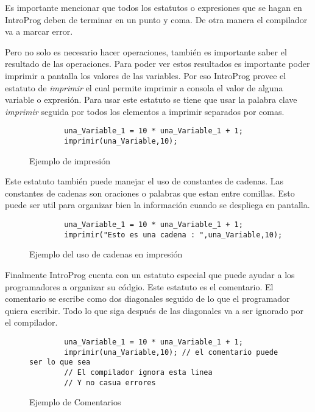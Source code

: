 Es importante mencionar que todos los estatutos o expresiones que se hagan en IntroProg deben de terminar en un punto y coma. De otra manera el compilador va a marcar error.

Pero no solo es necesario hacer operaciones, también es importante saber el resultado de las operaciones. Para poder ver estos resultados es importante poder imprimir a pantalla los valores de las variables. Por eso IntroProg provee el estatuto de \emph{imprimir} el cual permite imprimir a consola el valor de alguna variable o expresión. Para usar este estatuto se tiene que usar la palabra clave \emph{imprimir} seguida por todos los elementos a imprimir separados por comas.

\begin{figure}[!htbp]
    \centering
    
    \begin{lstlisting}
        una_Variable_1 = 10 * una_Variable_1 + 1;
        imprimir(una_Variable,10);

    \end{lstlisting}
    \caption{Ejemplo de impresión}
\end{figure}
\FloatBarrier



Este estatuto también puede manejar el uso de constantes de cadenas. Las constantes de cadenas son oraciones o palabras que estan entre comillas. Esto puede ser util para organizar bien la información cuando se despliega en pantalla.

\begin{figure}[!htbp]
    \centering
    
    \begin{lstlisting}
        una_Variable_1 = 10 * una_Variable_1 + 1;
        imprimir("Esto es una cadena : ",una_Variable,10);

    \end{lstlisting}
    \caption{Ejemplo del uso de cadenas en impresión}
\end{figure}
\FloatBarrier


Finalmente IntroProg cuenta con un estatuto especial que puede ayudar a los programadores a organizar su códgio. Este estatuto es el comentario. El comentario se escribe como dos diagonales seguido de lo que el programador quiera escribir. Todo lo que siga después de las diagonales va a ser ignorado por el compilador.

\begin{figure}[!htbp]
    \centering
    
    \begin{lstlisting}
        una_Variable_1 = 10 * una_Variable_1 + 1;
        imprimir(una_Variable,10); // el comentario puede ser lo que sea
        // El compilador ignora esta linea
        // Y no casua errores

    \end{lstlisting}
    \caption{Ejemplo de Comentarios}
\end{figure}
\FloatBarrier


